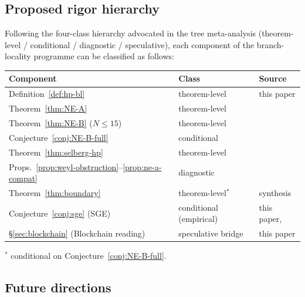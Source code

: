 \documentclass[11pt]{article}
\theoremstyle{definition}
\theoremstyle{remark}
\begin{document}
\subsection{Proposed rigor hierarchy}
\label{sec:rigor}

Following the four-class hierarchy advocated in the tree meta-analysis
(theorem-level / conditional / diagnostic / speculative), each
component of the branch-locality programme can be classified as
follows:

\begin{center}
\begin{tabular}{@{}lll@{}}
\toprule
Component & Class & Source \\
\midrule
Definition~\ref{def:hp-bl} & theorem-level & this paper \\
Theorem~\ref{thm:NE-A} & theorem-level & \cite{Geiger2026RHII} \\
Theorem~\ref{thm:NE-B} ($N\leq 15$) & theorem-level & \cite{Geiger2026RHII} \\
Conjecture~\ref{conj:NE-B-full} & conditional & \cite{Geiger2026RHII} \\
Theorem~\ref{thm:selberg-hp} & theorem-level & \cite{Selberg1956} \\
Props.~\ref{prop:weyl-obstruction}--\ref{prop:ne-a-compat} & diagnostic & \cite{Geiger2026RHIII} \\
Theorem~\ref{thm:boundary} & theorem-level${}^*$ & synthesis \\
Conjecture~\ref{conj:sge} (SGE) & conditional (empirical) & this paper, \cite{SGENote} \\
\S\ref{sec:blockchain} (Blockchain reading) & speculative bridge & this paper \\
\bottomrule
\end{tabular}
\end{center}
${}^*$ conditional on Conjecture~\ref{conj:NE-B-full}.

\subsection{Future directions}
\end{document}
